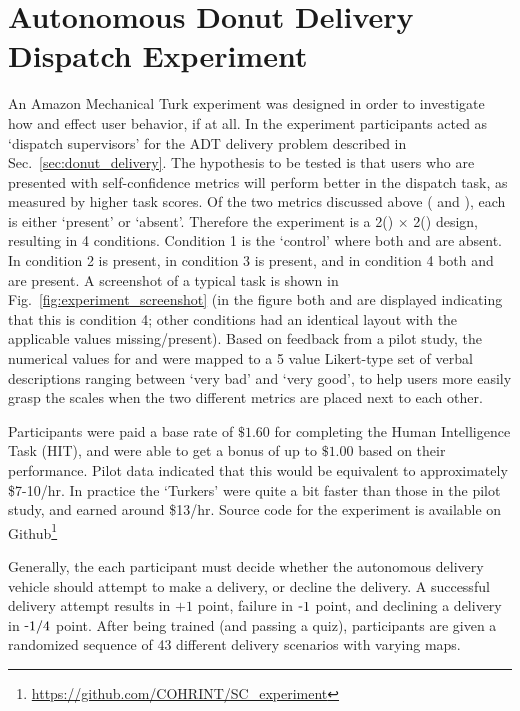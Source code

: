\section{Autonomous Donut Delivery Dispatch Experiment} \label{sec:exp_results}
An Amazon Mechanical Turk %
experiment was designed in order to investigate how \xQ{} and \xO{} effect user behavior, if at all. In the experiment participants acted as `dispatch supervisors' for the ADT delivery problem described in Sec.~\ref{sec:donut_delivery}. 
The hypothesis to be tested is that users who are presented with self-confidence metrics will perform better in the dispatch task, as measured by higher task scores. 
Of the two \famsec{} metrics discussed above (\xQ{} and \xO), each is either `present' or `absent'. Therefore the experiment is a 2(\xQ) $\times$ 2(\xO) design, resulting in 4 conditions. Condition 1 is the `control' where both \xQ{} and \xO{} are absent. In condition 2 \xQ{} is present, in condition 3 \xO{} is present, and in condition 4 both \xQ{} and \xO{} are present. A screenshot of a typical task is shown in Fig.~\ref{fig:experiment_screenshot} (in the figure both \xQ{} and \xO{} are displayed indicating that this is condition 4; other conditions had an identical layout with the applicable values missing/present). Based on feedback from a pilot study, the numerical values for \xQ{} and \xO{} were mapped to a 5 value Likert-type set of verbal descriptions ranging between `very bad' and `very good', to help users more easily grasp the scales when the two different metrics are placed next to each other.

Participants were paid a base rate of $\$1.60$ for completing the Human Intelligence Task (HIT), and were able to get a bonus of up to $\$1.00$ based on their performance. Pilot data indicated that this would be equivalent to approximately \$7-10/hr. In practice the `Turkers' were quite a bit faster than those in the pilot study, and earned around \$13/hr. Source code for the experiment is available on Github\footnote{\url{https://github.com/COHRINT/SC_experiment}}

Generally, the each participant must decide whether the autonomous delivery vehicle should attempt to make a delivery, or decline the delivery. A successful delivery attempt results in $+1$ point, failure in $\-1$ point, and declining a delivery in $\-1/4$ point. After being trained (and passing a quiz), participants are given a randomized sequence of 43 different delivery scenarios with varying maps.

